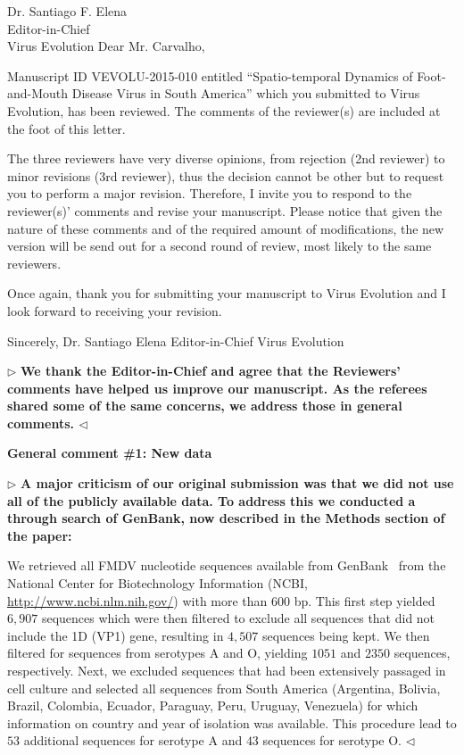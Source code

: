 \documentclass[12pt, a4paper]{letter} %
\newenvironment{reply}{$\triangleright$\bf}{$\triangleleft$}
\renewenvironment{quote}
               {\list{}{\rightmargin\leftmargin}%
                \item\relax\normalfont}
               {\endlist}
\begin{document}
\begin{letter}{
	Dr. Santiago F. Elena\\
    Editor-in-Chief \\
    Virus Evolution
}
Dear Mr. Carvalho,

Manuscript ID VEVOLU-2015-010 entitled ``Spatio-temporal Dynamics of Foot-and-Mouth Disease Virus in South America'' which you submitted to Virus Evolution, has been reviewed.  
The comments of the reviewer(s) are included at the foot of this letter.

The three reviewers have very diverse opinions, from rejection (2nd reviewer) to minor revisions (3rd reviewer), thus the decision cannot be other but to request you to perform a major revision.  
Therefore, I invite you to respond to the reviewer(s)' comments and revise your manuscript.  
Please notice that given the nature of these comments and of the required amount of modifications, the new version will be send out for a second round of review, most likely to the same reviewers.

Once again, thank you for submitting your manuscript to Virus Evolution and I look forward to receiving your revision.

Sincerely,
Dr. Santiago Elena
Editor-in-Chief
Virus Evolution

\begin{reply}
We thank the Editor-in-Chief and agree that the Reviewers' comments have helped us improve our manuscript. 
As the referees shared some of the same concerns, we address those in general comments.
\end{reply}


\textbf{General comment \#1: New data}

\begin{reply}
A major criticism of our original submission was that we did not use all of the publicly available data.
To address this we conducted a through search of GenBank, now described in the Methods section of the paper:
\begin{quote}
We retrieved all FMDV nucleotide sequences available from GenBank~\citep{Benson2013} from the National Center for Biotechnology Information (NCBI, \url{ http://www.ncbi.nlm.nih.gov/}) with more than $600$ bp.
This first step yielded $6, 907$ sequences which were then filtered to exclude all sequences that did not include the 1D (VP1) gene, resulting in $4, 507$ sequences being kept.
We then filtered for sequences from serotypes A and O, yielding $1051$ and $2350$ sequences, respectively.
Next, we excluded sequences that had been extensively passaged in cell culture and selected all sequences from South America (Argentina, Bolivia, Brazil, Colombia, Ecuador, Paraguay, Peru, Uruguay, Venezuela) for which information on country and year of isolation was available.
\end{quote}
This procedure lead to $53$ additional sequences for serotype A and $43$ sequences for serotype O. 
\end{reply}



\end{letter}
\end{document}
